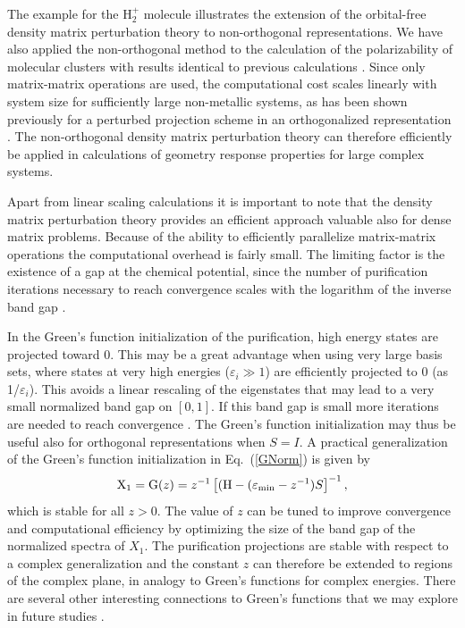 \documentclass[twocolumn,showpacs,preprintnumbers,amsmath,amssymb]{revtex4}
\begin{document}
The example for the H$_2^+$ molecule illustrates the extension of the orbital-free density matrix
perturbation theory to non-orthogonal representations. We have also applied the non-orthogonal
method to the calculation of the polarizability of molecular clusters with results
identical to previous calculations \cite{WeberPRT2}. Since 
only matrix-matrix operations are used, the computational cost 
scales linearly with system size for sufficiently large non-metallic systems, 
as has been shown previously for a perturbed projection scheme in an orthogonalized representation 
\cite{WeberPRT2}.  The non-orthogonal density matrix perturbation theory can therefore efficiently 
be applied in calculations of geometry response properties for large complex systems. 

Apart from linear scaling calculations it is important to note that the density
matrix perturbation theory provides an efficient approach valuable also for dense 
matrix problems. Because of the ability to efficiently parallelize matrix-matrix
operations the computational overhead is fairly small. The limiting factor is 
the existence of a gap at the chemical potential,
since the number of purification iterations necessary to reach convergence scales with the logarithm 
of the inverse band gap \cite{NiklassonTC2}.

In the Green's function initialization of the purification, high energy states are projected 
toward $0$.  This may be a great advantage when using very large basis sets, where states at very high energies
($\varepsilon_i \gg 1$) are efficiently projected to $0$ (as 1/$\varepsilon_i$). This avoids a linear rescaling of 
the eigenstates that may lead to
a very small normalized band gap on $[0,1]$. If this band gap is small more
iterations are needed to reach convergence \cite{NiklassonTC2,NiklassonTRS4}.
The Green's function initialization may thus be
useful also for orthogonal representations when $S=I$. 
A practical generalization of the
Green's function initialization in Eq.\ (\ref{GNorm}) is given by
\begin{equation}
{\rm X}_1 = {\rm G}(z) = z^{-1}\left[({\rm H} - (\varepsilon_{\rm min} - z^{-1})S\right]^{-1},
\end{equation}
which is stable for all $z > 0$. The value of $z$ can be tuned to improve convergence and computational
efficiency by optimizing the size of the band gap of the normalized spectra of $X_1$. 
The purification projections are stable with respect to a complex generalization and the
constant $z$ can therefore be extended to regions of the complex plane, in analogy to 
Green's functions for complex energies. There are several other interesting connections to Green's functions
that we may explore in future studies \cite{Niklasson_Unpubl}.
\end{document}
